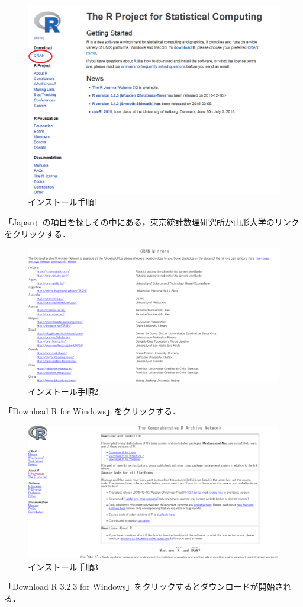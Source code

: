 \begin{figure}[H]
\centering
\includegraphics[width=15cm]{R001.png}
\caption{インストール手順1}\label{R001の画像}
\end{figure}
「Japan」の項目を探しその中にある，東京統計数理研究所か山形大学のリンクをクリックする．

\begin{figure}[H]
\centering
\includegraphics[width=15cm]{R002.png}
\caption{インストール手順2}\label{R002の画像}
\end{figure}

「Download R for Windows」をクリックする．

\begin{figure}[H]
\centering
\includegraphics[width=15cm]{R003.png}
\caption{インストール手順3}\label{R003の画像}
\end{figure}
「Download R 3.2.3 for Windows」をクリックするとダウンロードが開始される．


